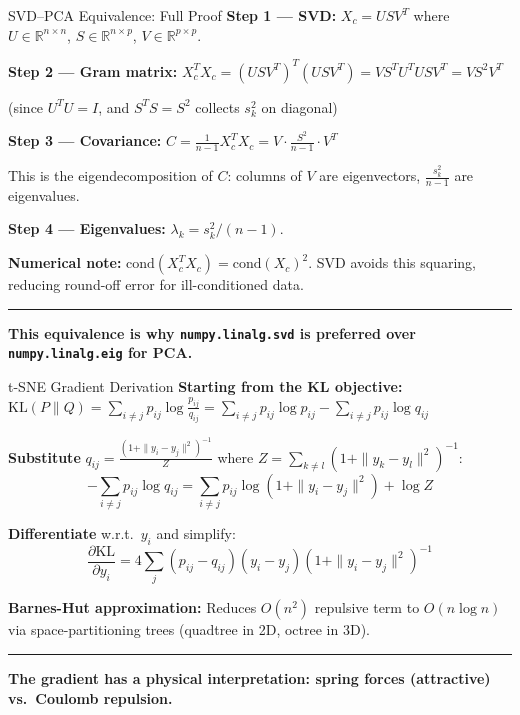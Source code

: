 \documentclass[8pt,aspectratio=169]{beamer}
\newcommand{\bottomnote}[1]{%
\vfill
\vspace{-2mm}
\textcolor{mllavender2}{\rule{\textwidth}{0.4pt}}
\vspace{1mm}
\footnotesize
\textbf{#1}
}
\begin{document}
\begin{frame}[t]{SVD--PCA Equivalence: Full Proof}
\textbf{Step 1 --- SVD:} $X_c = U S V^T$ where $U \in \mathbb{R}^{n \times n}$, $S \in \mathbb{R}^{n \times p}$, $V \in \mathbb{R}^{p \times p}$.

\vspace{0.2em}
\textbf{Step 2 --- Gram matrix:}
$X_c^T X_c = (USV^T)^T (USV^T) = VS^TU^TUS V^T = VS^2V^T$

(since $U^TU = I$, and $S^TS = S^2$ collects $s_k^2$ on diagonal)

\vspace{0.2em}
\textbf{Step 3 --- Covariance:}
$C = \frac{1}{n-1}X_c^TX_c = V \cdot \frac{S^2}{n-1} \cdot V^T$

This is the eigendecomposition of $C$: columns of $V$ are eigenvectors, $\frac{s_k^2}{n-1}$ are eigenvalues.

\vspace{0.2em}
\textbf{Step 4 --- Eigenvalues:} $\lambda_k = s_k^2/(n-1)$.

\vspace{0.2em}
\textbf{Numerical note:} $\text{cond}(X_c^TX_c) = \text{cond}(X_c)^2$. SVD avoids this squaring, reducing round-off error for ill-conditioned data.
\bottomnote{This equivalence is why \texttt{numpy.linalg.svd} is preferred over \texttt{numpy.linalg.eig} for PCA.}
\end{frame}

\begin{frame}[t]{t-SNE Gradient Derivation}
\textbf{Starting from the KL objective:}
$\text{KL}(P\|Q) = \sum_{i \neq j} p_{ij} \log \frac{p_{ij}}{q_{ij}} = \sum_{i \neq j} p_{ij}\log p_{ij} - \sum_{i \neq j} p_{ij}\log q_{ij}$

\vspace{0.2em}
\textbf{Substitute} $q_{ij} = \frac{(1+\|y_i-y_j\|^2)^{-1}}{Z}$ where $Z = \sum_{k\neq l}(1+\|y_k-y_l\|^2)^{-1}$:
\[
-\sum_{i\neq j} p_{ij}\log q_{ij} = \sum_{i\neq j}p_{ij}\log(1+\|y_i-y_j\|^2) + \log Z
\]

\vspace{0.2em}
\textbf{Differentiate} w.r.t.\ $y_i$ and simplify:
\[
\frac{\partial \text{KL}}{\partial y_i} = 4\sum_j (p_{ij} - q_{ij})(y_i - y_j)(1+\|y_i - y_j\|^2)^{-1}
\]

\vspace{0.2em}
\textbf{Barnes-Hut approximation:} Reduces $O(n^2)$ repulsive term to $O(n\log n)$ via space-partitioning trees (quadtree in 2D, octree in 3D).
\bottomnote{The gradient has a physical interpretation: spring forces (attractive) vs.\ Coulomb repulsion.}
\end{frame}
\end{document}
